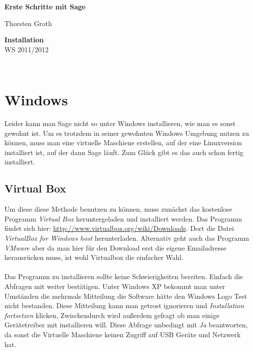 \documentclass[a4paper,10pt,DIV15]{scrartcl}
\begin{document}

\begin{center}
\textbf{\LARGE Erste Schritte mit Sage}\\
\end{center}
\begin{minipage}{6cm}
Thorsten Groth
\end{minipage}\hfill
\begin{minipage}{2.5cm}
\begin{flushright}
\textbf{Installation}\\
WS 2011/2012
\end{flushright}
\end{minipage}\\[1cm]




\section{Windows}
Leider kann man Sage nicht so unter Windows installieren, wie man es sonst gewohnt ist. Um es trotzdem in seiner gewohnten Windows
Umgebung nutzen zu können, muss man eine virtuelle Maschiene erstellen, auf der eine Linuxversion installiert ist, auf der dann 
Sage läuft. 
Zum Glück gibt es das auch schon fertig installiert. 

\subsection{Virtual Box}
Um diese diese Methode benutzen zu können, muss zunächst das kostenlose Programm \emph{Virtual Box} heruntergeladen und installiert werden. 
Das Programm findet sich hier: \url{http://www.virtualbox.org/wiki/Downloads}. Dort die Datei \emph{VirtualBox for Windows host} herunterladen.
Alternativ geht auch das Programm \emph{VMware} aber 
da man hier für den Download erst die eigene Emailadresse herausrücken muss, ist wohl Virtualbox die einfacher Wahl.
\paragraph{}
Das Programm zu installieren sollte keine Schwierigkeiten bereiten. Einfach die Abfragen mit weiter bestätigen. Unter Windows XP bekommt
man unter Umständen die mehrmals Mitteilung die Software hätte den Windows Logo Test nicht bestanden. Diese Mitteilung kann man 
getrost ignorieren und \emph{Installation fortsetzen} klicken. Zwischendurch wird außerdem gefragt ob man einige Gerätetreiber mit installieren will.
Diese Abfrage unbedingt mit \emph{Ja} beantworten, da sonst die Virtuelle Maschiene keinen Zugriff auf USB Geräte und Netzwerk hat.
\end{document}
